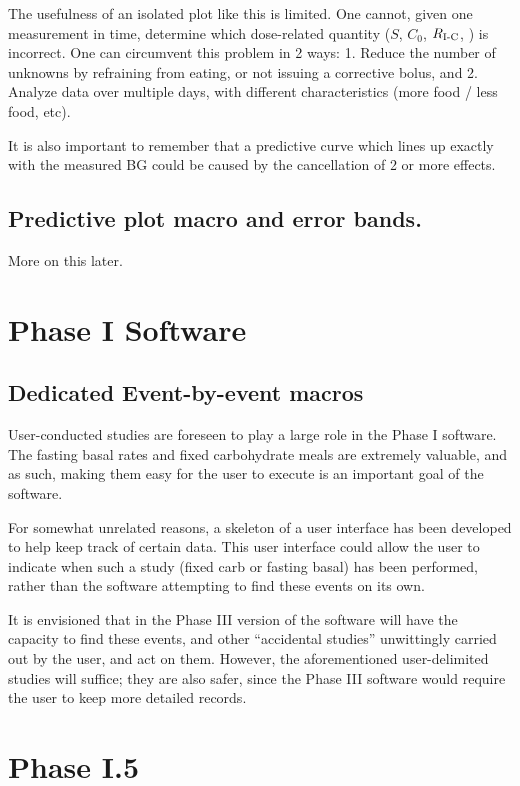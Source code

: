 The usefulness of an isolated plot like this is limited. One cannot, given one measurement in time, 
determine which dose-related quantity ($S$, $C_0$, $R_\text{I-C}$, \rbas) is incorrect. One can circumvent 
this problem in 2 ways: 1. Reduce the number of unknowns by refraining from eating, or not issuing 
a corrective bolus, and 2. Analyze data over multiple days, with different characteristics (more 
food / less food, etc). 

It is also important to remember that a predictive curve which lines up exactly with the measured 
BG could be caused by the cancellation of 2 or more effects.

\subsection{Predictive plot macro and error bands.} More on this later.


\section{Phase I Software}

\subsection{Dedicated Event-by-event macros}

User-conducted studies are foreseen to play a large role in the Phase I software. The fasting basal 
rates and fixed carbohydrate meals are extremely valuable, and as such, making them easy for the user 
to execute is an important goal of the software.

For somewhat unrelated reasons, a skeleton of a user interface has been developed to help keep track 
of certain data. This user interface could allow the user to indicate when such a study (fixed carb 
or fasting basal) has been performed, rather than the software attempting to find these events on 
its own.

It is envisioned that in the Phase III version of the software will have the capacity to find these 
events, and other ``accidental studies'' unwittingly carried out by the user, and act on them. 
However, the aforementioned user-delimited studies will suffice; they are also safer, since the Phase 
III software would require the user to keep more detailed records.

\section{Phase I.5}

